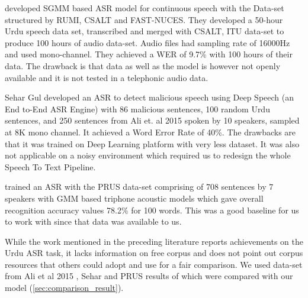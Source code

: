 \cite{naeem_subspace_2020} developed SGMM based ASR model for continuous speech with the Data-set structured by RUMI, CSALT and FAST-NUCES. They developed a 50-hour Urdu speech data set, transcribed and merged with CSALT, ITU data-set to produce 100 hours of audio data-set. Audio files had sampling rate of 16000Hz and used mono-channel. They achieved a WER of 9.7\% with 100 hours of their data. The drawback is that data as well as the model is however not openly available and it is not tested in a telephonic audio data. 
 
Sehar Gul \cite{sehar_gul_detecting_2020} developed an ASR to detect malicious speech using Deep Speech \cite{mozilla_deep_nodate} (an End to-End ASR Engine) with 86 malicious sentences, 100 random Urdu sentences, and 250 sentences from Ali et. al 2015 \cite{ali_automatic_2015} spoken by 10 speakers, sampled at 8K mono channel. It achieved a Word Error Rate of 40\%. The drawbacks are that it was trained on Deep Learning platform with very less dataset. It was also not applicable on a noisy environment which required us to redesign the whole Speech To Text Pipeline.   

\cite{qureshi_urdu_2021} trained an ASR with the PRUS data-set  \cite{zia_pronouncur_2018} comprising of 708 sentences by 7 speakers with GMM based triphone acoustic models which gave overall recognition accuracy values 78.2\% for 100 words. This was a good baseline for us to work with since that data was available to us. %

While the work mentioned in the preceding literature reports achievements on the Urdu ASR task, it lacks information on free corpus and does not point out corpus resources that others could adopt and use for a fair comparison. We used data-set from Ali et al 2015 \cite{ali_automatic_2015}, Sehar \cite{sehar_gul_detecting_2020} and PRUS \cite{zia_pronouncur_2018} \cite{qureshi_urdu_2021} results of which were compared with our model (\ref{sec:comparison_result}).

